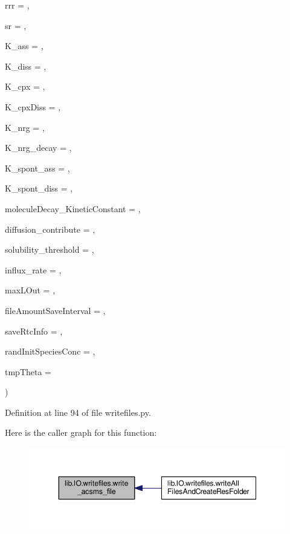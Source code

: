 {{\begin{DoxyParamCaption}
\item[{}]{rrr = {}, }
\item[{}]{sr = {}, }
\item[{}]{K\-\_\-ass = {}, }
\item[{}]{K\-\_\-diss = {}, }
\item[{}]{K\-\_\-cpx = {}, }
\item[{}]{K\-\_\-cpx\-Diss = {}, }
\item[{}]{K\-\_\-nrg = {}, }
\item[{}]{K\-\_\-nrg\-\_\-decay = {}, }
\item[{}]{K\-\_\-spont\-\_\-ass = {}, }
\item[{}]{K\-\_\-spont\-\_\-diss = {}, }
\item[{}]{molecule\-Decay\-\_\-\-Kinetic\-Constant = {}, }
\item[{}]{diffusion\-\_\-contribute = {}, }
\item[{}]{solubility\-\_\-threshold = {}, }
\item[{}]{influx\-\_\-rate = {}, }
\item[{}]{max\-L\-Out = {}, }
\item[{}]{file\-Amount\-Save\-Interval = {}, }
\item[{}]{save\-Rtc\-Info = {}, }
\item[{}]{rand\-Init\-Species\-Conc = {}, }
\item[{}]{tmp\-Theta = {}}
\end{DoxyParamCaption}
)}}\label{a00114_a593c166784723a06f4f6a1a96890aa17}


Definition at line 94 of file writefiles.\-py.



Here is the caller graph for this function\-:\nopagebreak
\begin{figure}[H]
\begin{center}
\leavevmode
\includegraphics[width=348pt]{a00114_a593c166784723a06f4f6a1a96890aa17_icgraph}
\end{center}
\end{figure}


